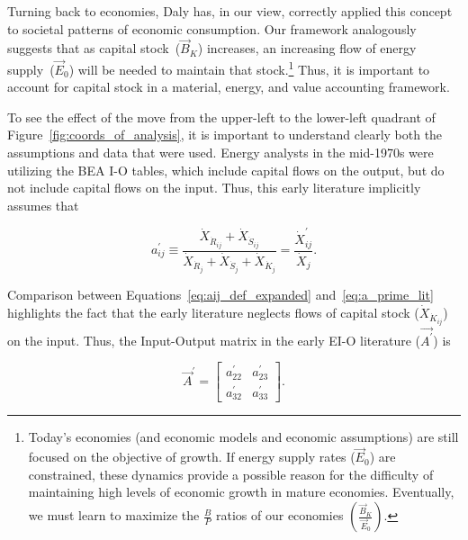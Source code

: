 Turning back to economies,
Daly has, in our view,
correctly applied this concept to societal patterns
of economic consumption.\cite{Daly1995}
Our framework analogously suggests that
as capital stock~($\vec{B}_{K}$) increases,
an increasing flow of energy supply~($\vec{E}_{0}$)
will be needed to maintain that stock.\footnote{Today's economies 
	(and economic models and economic assumptions) are still focused
	on the objective of growth.
	If energy supply rates ($\vec{E}_{0}$) are constrained,
	these dynamics provide a possible reason for the difficulty
	of maintaining high levels of economic growth
	in mature economies.
	Eventually,
	we must learn to maximize the $\frac{B}{P}$
	ratios of our economies 
	$\left(\frac{\vec{B}_{K}}{\vec{E}_{0}}\right)$.}
Thus, it is important to account for capital stock in 
a material, energy, and value accounting framework.

To see the effect of the move from the upper-left to the lower-left
quadrant of Figure~\ref{fig:coords_of_analysis}, 
it is important to understand clearly both the assumptions and data that were used.
Energy analysts in the mid-1970s were utilizing the BEA
I-O tables,
which include capital flows on the output, but do not include capital flows on the input. 
Thus, this early literature implicitly assumes that 

\begin{equation} \label{eq:a_prime_lit}
	a_{ij}^{'} 
	\equiv \frac{\dot{X}_{\dot{R}_{ij}} + \dot{X}_{\dot{S}_{ij}}}
				{\dot{X}_{\dot{R}_{j}} + \dot{X}_{\dot{S}_{j}} + \dot{X}_{\dot{K}_{j}}}
	= \frac{\dot{X}_{ij}^{'}}{\dot{X}_{j}}.
\end{equation}

\noindent{}Comparison between Equations~\ref{eq:aij_def_expanded}
and~\ref{eq:a_prime_lit}
highlights the fact that the early literature neglects flows of capital stock
($\dot{X}_{\dot{K}_{ij}}$) on the input.
Thus, the Input-Output matrix in the early EI-O literature
($\vec{A^{'}}$) is

\begin{equation} \label{eq:A_matrix_def_literature}
	\vec{A}^{'} 
	=
	\begin{bmatrix}
		a_{22}^{'} & a_{23}^{'}	\\[4pt]   %
		a_{32}^{'} & a_{33}^{'}	
	\end{bmatrix}.
\end{equation}

